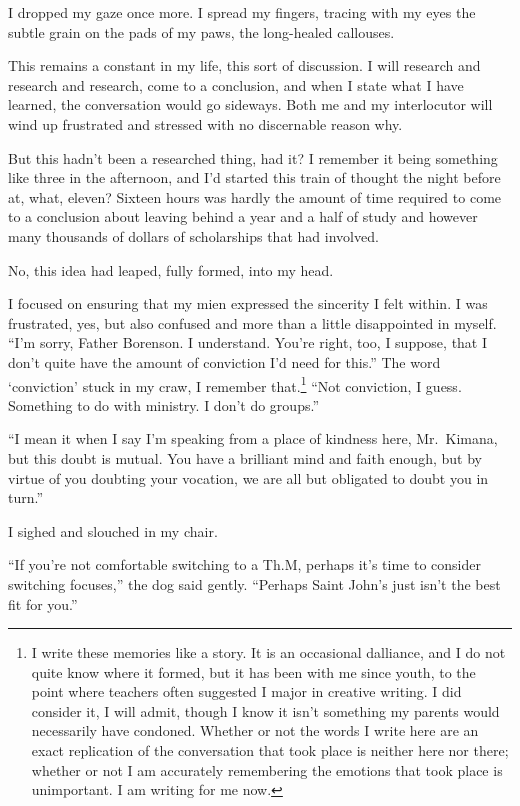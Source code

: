I dropped my gaze once more. I spread my fingers, tracing with my eyes the subtle grain on the pads of my paws, the long-healed callouses.

This remains a constant in my life, this sort of discussion. I will research and research and research, come to a conclusion, and when I state what I have learned, the conversation would go sideways. Both me and my interlocutor will wind up frustrated and stressed with no discernable reason why.

But this hadn't been a researched thing, had it? I remember it being something like three in the afternoon, and I'd started this train of thought the night before at, what, eleven? Sixteen hours was hardly the amount of time required to come to a conclusion about leaving behind a year and a half of study and however many thousands of dollars of scholarships that had involved.

No, this idea had leaped, fully formed, into my head.

I focused on ensuring that my mien expressed the sincerity I felt within. I was frustrated, yes, but also confused and more than a little disappointed in myself. ``I'm sorry, Father Borenson. I understand. You're right, too, I suppose, that I don't quite have the amount of conviction I'd need for this.'' The word `conviction' stuck in my craw, I remember that.\footnote{I write these memories like a story. It is an occasional dalliance, and I do not quite know where it formed, but it has been with me since youth, to the point where teachers often suggested I major in creative writing. I did consider it, I will admit, though I know it isn't something my parents would necessarily have condoned. Whether or not the words I write here are an exact replication of the conversation that took place is neither here nor there; whether or not I am accurately remembering the emotions that took place is unimportant. I am writing for me now.} ``Not conviction, I guess. Something to do with ministry. I don't do groups.''

``I mean it when I say I'm speaking from a place of kindness here, Mr.~Kimana, but this doubt is mutual. You have a brilliant mind and faith enough, but by virtue of you doubting your vocation, we are all but obligated to doubt you in turn.''

I sighed and slouched in my chair.

``If you're not comfortable switching to a Th.M, perhaps it's time to consider switching focuses,'' the dog said gently. ``Perhaps Saint John's just isn't the best fit for you.''

